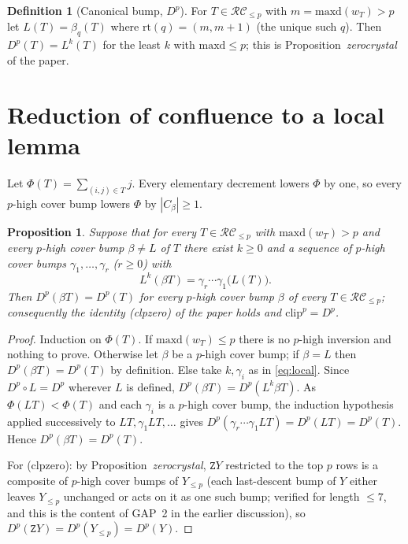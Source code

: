 \documentclass{amsart}
\newtheorem{proposition}[lemma]{Proposition}
\theoremstyle{definition}
\newtheorem{definition}[lemma]{Definition}
\theoremstyle{remark}
\newcommand{\RC}{\mathcal{RC}}
\newcommand{\maxd}{\mathrm{maxd}}
\newcommand{\wof}[1]{w_{#1}}
\newcommand{\zeromap}{\mathtt{Z}}
\newcommand{\rt}{\mathrm{rt}}
\begin{document}
\begin{definition}[Canonical bump, $D^p$]
For $T\in\RC_{\leq p}$ with $m=\maxd(\wof T)>p$ let $L(T)=\beta_{q}(T)$ where $\rt(q)=(m,m+1)$ (the unique such $q$). Then $D^p(T)=L^{k}(T)$ for the least $k$ with $\maxd\leq p$; this is Proposition~\emph{zerocrystal} of the paper.
\end{definition}

\section{Reduction of confluence to a local lemma}\label{sec:reduction}

Let $\Phi(T)=\sum_{(i,j)\in T}j$. Every elementary decrement lowers $\Phi$ by one, so every $p$-high cover bump lowers $\Phi$ by $|C_\beta|\geq1$.

\begin{proposition}\label{prop:local}
Suppose that for every $T\in\RC_{\leq p}$ with $\maxd(\wof T)>p$ and every $p$-high cover bump $\beta\neq L$ of $T$ there exist $k\geq 0$ and a sequence of $p$-high cover bumps $\gamma_1,\ldots,\gamma_r$ ($r\geq0$) with
\begin{equation}\label{eq:local}
L^{k}(\beta T)=\gamma_r\cdots\gamma_1\bigl(L(T)\bigr)\text{.}
\end{equation}
Then $D^p(\beta T)=D^p(T)$ for every $p$-high cover bump $\beta$ of every $T\in\RC_{\leq p}$; consequently the identity (clpzero) of the paper holds and $\mathrm{clip}^p=D^p$.
\end{proposition}
\begin{proof}
Induction on $\Phi(T)$. If $\maxd(\wof T)\leq p$ there is no $p$-high inversion and nothing to prove. Otherwise let $\beta$ be a $p$-high cover bump; if $\beta=L$ then $D^p(\beta T)=D^p(T)$ by definition. Else take $k,\gamma_i$ as in \eqref{eq:local}. Since $D^p\circ L=D^p$ wherever $L$ is defined, $D^p(\beta T)=D^p(L^k\beta T)$. As $\Phi(LT)<\Phi(T)$ and each $\gamma_i$ is a $p$-high cover bump, the induction hypothesis applied successively to $LT,\gamma_1LT,\ldots$ gives $D^p(\gamma_r\cdots\gamma_1 LT)=D^p(LT)=D^p(T)$. Hence $D^p(\beta T)=D^p(T)$.

For (clpzero): by Proposition~\emph{zerocrystal}, $\zeromap Y$ restricted to the top $p$ rows is a composite of $p$-high cover bumps of $Y_{\leq p}$ (each last-descent bump of $Y$ either leaves $Y_{\leq p}$ unchanged or acts on it as one such bump; verified for length $\leq7$, and this is the content of GAP~2 in the earlier discussion), so $D^p(\zeromap Y)=D^p(Y_{\leq p})=D^p(Y)$.
\end{proof}
\end{document}
